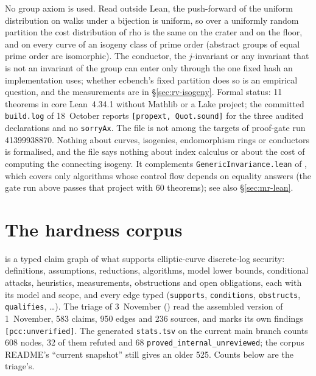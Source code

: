 No group axiom is used. Read outside Lean, the push-forward of the uniform
distribution on walks under a bijection is uniform, so over a uniformly
random partition the cost distribution of rho is the same on the crater and
on the floor, and on every curve of an isogeny class of prime order (abstract
groups of equal prime order are isomorphic). The conductor, the
$j$-invariant or any invariant that is not an invariant of the group can
enter only through the one fixed hash an implementation uses; whether
ecbench's fixed partition does so is an empirical question, and the
measurements are in \S\ref{sec:rv-isogeny}. Formal status: 11 theorems in
core Lean~4.34.1 without Mathlib or a Lake project; the committed
\texttt{build.log} of 18~October reports \texttt{[propext, Quot.sound]} for
the three audited declarations and no \texttt{sorryAx}. The file is not
among the targets of proof-gate run 41399938870. Nothing about curves,
isogenies, endomorphism rings or conductors is formalised, and the file says
nothing about index calculus or about the cost of computing the connecting
isogeny. It complements \texttt{GenericInvariance.lean} of
, which covers only
algorithms whose control flow depends on equality answers (the gate run above
passes that project with 60 theorems); see also \S\ref{sec:mr-lean}.

\section{The hardness corpus}\label{sec:hd-corpus}

 is a typed claim graph of what supports
elliptic-curve discrete-log security: definitions, assumptions, reductions,
algorithms, model lower bounds, conditional attacks, heuristics,
measurements, obstructions and open obligations, each with its model and
scope, and every edge typed (\texttt{supports}, \texttt{conditions},
\texttt{obstructs}, \texttt{qualifies}, \ldots). The triage of
3~November () read the
assembled version of 1~November, 583 claims, 950 edges and 236 sources, and
marks its own findings \texttt{[pcc:unverified]}. The generated
\texttt{stats.tsv} on the current main branch counts 608 nodes, 32 of them
refuted and 68 \texttt{proved\_internal\_unreviewed}; the corpus README's
``current snapshot'' still gives an older 525. Counts below are the
triage's.

